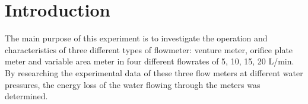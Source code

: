 \section{Introduction}
\label{sec:introduction}
\FloatBarrier %
The main purpose of this experiment is to investigate the operation and characteristics of three different
types of flowmeter: venture meter, orifice plate meter and variable area meter in four different flowrates of 5, 10, 15, 20 L/min.
By researching the experimental data of these three flow meters at different water pressures, 
the energy loss of the water flowing through the meters was determined.
